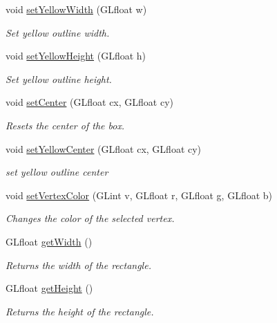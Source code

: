 \begin{DoxyCompactItemize}
void \hyperlink{class_box_a6e67d8b0b238fa242d39d4ace6bd2a5e}{set\+Yellow\+Width} (G\+Lfloat w)
\begin{DoxyCompactList}\small\item\em Set yellow outline width. \end{DoxyCompactList}\item 
void \hyperlink{class_box_acccf17a293a03f167a8608a42736f622}{set\+Yellow\+Height} (G\+Lfloat h)
\begin{DoxyCompactList}\small\item\em Set yellow outline height. \end{DoxyCompactList}\item 
void \hyperlink{class_box_a0f33ff4b10edd0fe29ebd65087842610}{set\+Center} (G\+Lfloat cx, G\+Lfloat cy)
\begin{DoxyCompactList}\small\item\em Resets the center of the box. \end{DoxyCompactList}\item 
void \hyperlink{class_box_a29e5b50584bae35cca819ca57e1ba13c}{set\+Yellow\+Center} (G\+Lfloat cx, G\+Lfloat cy)
\begin{DoxyCompactList}\small\item\em set yellow outline center \end{DoxyCompactList}\item 
void \hyperlink{class_box_a909ede0f87b2cbe3f9982f8c14297032}{set\+Vertex\+Color} (G\+Lint v, G\+Lfloat r, G\+Lfloat g, G\+Lfloat b)
\begin{DoxyCompactList}\small\item\em Changes the color of the selected vertex. \end{DoxyCompactList}\item 
\mbox{\label{class_box_a02d15c0149fb43c84c831142697ebc6f}} 
G\+Lfloat \hyperlink{class_box_a02d15c0149fb43c84c831142697ebc6f}{get\+Width} ()
\begin{DoxyCompactList}\small\item\em Returns the width of the rectangle. \end{DoxyCompactList}\item 
\mbox{\label{class_box_ab4283a4e09faa73b25e32a5942377a4e}} 
G\+Lfloat \hyperlink{class_box_ab4283a4e09faa73b25e32a5942377a4e}{get\+Height} ()
\begin{DoxyCompactList}\small\item\em Returns the height of the rectangle. \end{DoxyCompactList}\item 

\end{DoxyCompactItemize}
